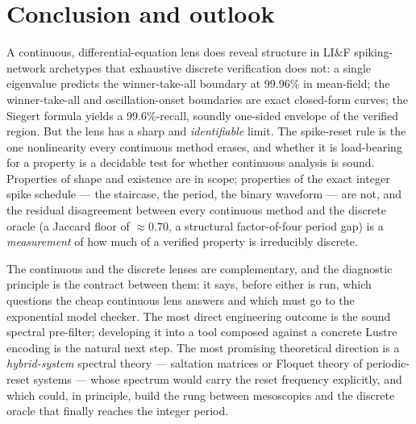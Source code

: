 \documentclass[conference]{IEEEtran}
\begin{document}
\section{Conclusion and outlook}\label{sec:conclusion}

A continuous, differential-equation lens does reveal structure in LI\&F
spiking-network archetypes that exhaustive discrete verification does not: a
single eigenvalue predicts the winner-take-all boundary at 99.96\% in
mean-field; the winner-take-all and oscillation-onset boundaries are exact
closed-form curves; the Siegert formula yields a 99.6\%-recall, soundly
one-sided envelope of the verified region. But the lens has a sharp and
\emph{identifiable} limit. The spike-reset rule is the one nonlinearity every
continuous method erases, and whether it is load-bearing for a property is a
decidable test for whether continuous analysis is sound. Properties of shape and
existence are in scope; properties of the exact integer spike schedule --- the
staircase, the period, the binary waveform --- are not, and the residual
disagreement between every continuous method and the discrete oracle (a Jaccard
floor of $\approx 0.70$, a structural factor-of-four period gap) is a
\emph{measurement} of how much of a verified property is irreducibly discrete.

The continuous and the discrete lenses are complementary, and the diagnostic
principle is the contract between them: it says, before either is run, which
questions the cheap continuous lens answers and which must go to the exponential
model checker. The most direct engineering outcome is the sound spectral
pre-filter; developing it into a tool composed against a concrete Lustre
encoding is the natural next step. The most promising theoretical direction is a
\emph{hybrid-system} spectral theory --- saltation matrices or Floquet theory of
periodic-reset systems \cite{KhalilNonlinear} --- whose spectrum would carry the
reset frequency explicitly, and which could, in principle, build the rung
between mesoscopics and the discrete oracle that finally reaches the integer
period.



\end{document}
